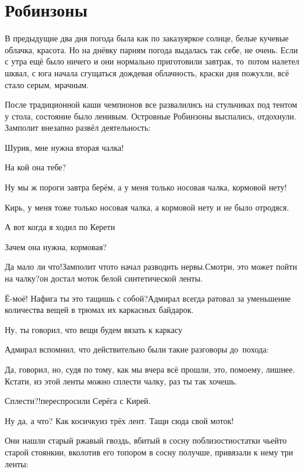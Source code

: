 \chapter{Робинзоны}
\vepsianrose

В предыдущие два дня погода была как по заказу\mdash яркое солнце, белые кучевые облачка, красота. Но на днёвку парням погода выдалась так себе, не очень. Если с утра ещё было ничего и они нормально приготовили завтрак, то~потом налетел шквал, с юга начала сгущаться дождевая облачность, краски дня пожухли, всё стало серым, мрачным.

После традиционной каши чемпионов все развалились на стульчиках под тентом у стола, состояние было ленивым. Островные Робинзоны выспались, отдохнули. Замполит внезапно развёл деятельность:

\diagdash Шурик, мне нужна вторая чалка!

\diagdash На кой она тебе?

\diagdash Ну мы ж пороги завтра берём, а у меня только носовая чалка, кормовой нету!

\diagdash Кирь, у меня тоже только носовая чалка, а кормовой нету и не было отродяся.

\diagdash А вот когда я ходил по Керети\myldots{}

\diagdash Зачем она нужна, кормовая?

\diagdash Да мало ли что!\mdash Замполит что\sdash то начал разводить нервы.\mdash Смотри, это может пойти на чалку?\mdash он достал моток белой синтетической ленты.

\diagdash Ё-моё! Нафига ты это тащишь с собой?\mdash Адмирал всегда ратовал за уменьшение количества вещей в трюмах их каркасных байдарок.

\diagdash Ну, ты говорил, что вещи будем вязать к каркасу\myldots{}

Адмирал вспомнил, что действительно были такие разговоры до~похода:

\diagdash Да, говорил, но, судя по тому, как мы вчера всё прошли, это, по\sdash моему, лишнее. Кстати, из этой ленты можно сплести чалку, раз ты так хочешь.

\diagdash Сплести?!\mdash переспросили Серёга с Кирей.

\diagdash Ну да, а что? Как косичку\mdash из трёх лент. Тащи сюда свой моток!

Они нашли старый ржавый гвоздь, вбитый в сосну поблизости\mdash остатки чьей\sdash то старой стоянки\mdash и, вколотив его топором в сосну получше, привязали к нему три ленты:

